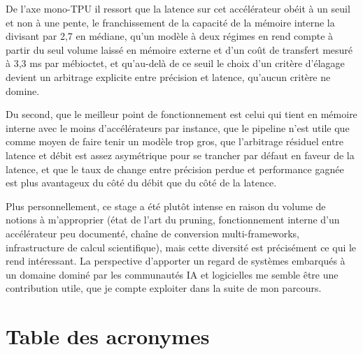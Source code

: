 \documentclass[11pt,a4paper]{report}
\begin{document}
De l'axe mono-TPU il ressort que la latence sur cet accélérateur obéit à un seuil et non à une pente, le franchissement de la capacité de la mémoire interne la divisant par 2,7 en médiane, qu'un modèle à deux régimes en rend compte à partir du seul volume laissé en mémoire externe et d'un coût de transfert mesuré à 3,3 ms par mébioctet, et qu'au-delà de ce seuil le choix d'un critère d'élagage devient un arbitrage explicite entre précision et latence, qu'aucun critère ne domine.

Du second, que le meilleur point de fonctionnement est celui qui tient en mémoire interne avec le moins d'accélérateurs par instance, que le pipeline n'est utile que comme moyen de faire tenir un modèle trop gros, que l'arbitrage résiduel entre latence et débit est assez asymétrique pour se trancher par défaut en faveur de la latence, et que le taux de change entre précision perdue et performance gagnée est plus avantageux du côté du débit que du côté de la latence.

Plus personnellement, ce stage a été plutôt intense en raison du volume de notions à m'approprier (état de l'art du pruning, fonctionnement interne d'un accélérateur peu documenté, chaîne de conversion multi-frameworks, infrastructure de calcul scientifique), mais cette diversité est précisément ce qui le rend intéressant. La perspective d'apporter un regard de systèmes embarqués à un domaine dominé par les communautés IA et logicielles me semble être une contribution utile, que je compte exploiter dans la suite de mon parcours.




\appendix
\chapter*{Table des acronymes}
\thispagestyle{plain}
\end{document}
